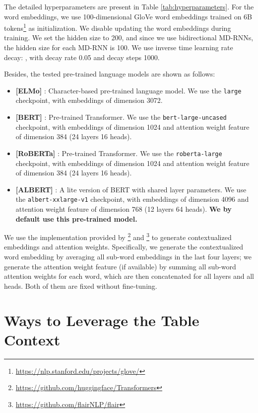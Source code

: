 \documentclass[11pt,a4paper]{article}
\begin{document}
The detailed hyperparameters are present in Table \ref{tab:hyperparameters}.
For the word embeddings, we use 100-dimensional GloVe word embeddings
trained on 6B tokens\footnote{\url{https://nlp.stanford.edu/projects/glove/}} as initialization.
We disable updating the word embeddings during training.
We set the hidden size to 200, and since we use bidirectional MD-RNNs, the hidden size for each MD-RNN is 100.
We use inverse time learning rate decay: ,
with decay rate 0.05 and decay steps 1000.

Besides, the tested pre-trained language models are shown as follows:
\begin{itemize}
    \item \textbf{[ELMo]} \cite{elmo}:
        Character-based pre-trained language model.
        We use the \texttt{large} checkpoint, with embeddings of dimension 3072.
    \item \textbf{[BERT]} \cite{bert}:
        Pre-trained Transformer.
        We use the \texttt{bert-large-uncased} checkpoint,
        with embeddings of dimension 1024 and attention weight feature of dimension 384 (24 layers  16 heads).
    \item \textbf{[RoBERTa]} \cite{roberta}:
        Pre-trained Transformer.
        We use the \texttt{roberta-large} checkpoint,
        with embeddings of dimension 1024 and attention weight feature of dimension 384 (24 layers  16 heads).
    \item \textbf{[ALBERT]} \cite{albert}:
        A lite version of BERT with shared layer parameters.
        We use the \texttt{albert-xxlarge-v1} checkpoint,
        with embeddings of dimension 4096 and attention weight feature of dimension 768 (12 layers  64 heads).
        \textbf{We by default use this pre-trained model.}
\end{itemize}


We use the implementation provided by \citet{Wolf2019HuggingFacesTS}\footnote{\url{https://github.com/huggingface/Transformers}}
and \citet{akbik2019flair}\footnote{\url{https://github.com/flairNLP/flair}} to generate contextualized embeddings and attention weights.
Specifically, we generate the contextualized word embedding by averaging all sub-word embeddings in the last four layers;
we generate the attention weight feature (if available) by summing all sub-word attention weights for each word,
which are then concatenated for all layers and all heads.
Both of them are fixed without fine-tuning.


\section{Ways to Leverage the Table Context} \label{sec:context}
\end{document}
